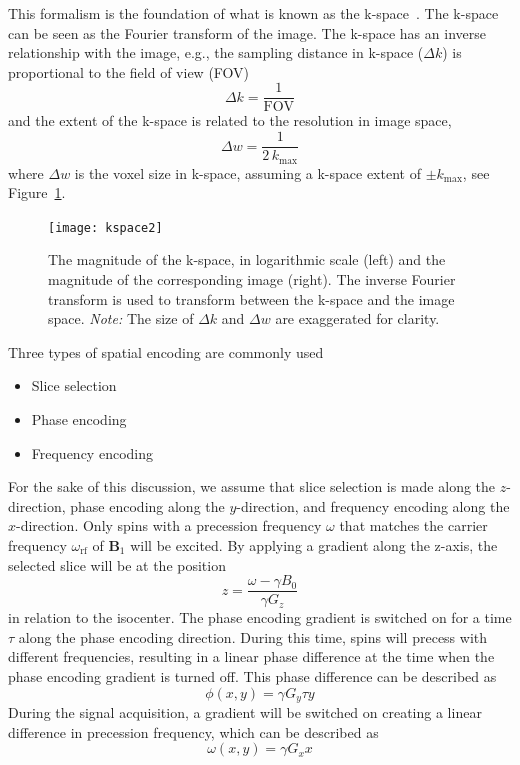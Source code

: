 This formalism is the foundation of what is known as the k-space~\cite{Twieg1983, Ljunggren1983}. The k-space can be seen as the Fourier transform of the image. The k-space has an inverse relationship with the image, e.g., the sampling distance in k-space ($\Delta k$) is proportional to the field of view (FOV) 
\begin{equation}
    \Delta k = \frac{1}{\textrm{FOV}}
\end{equation}
and the extent of the k-space is related to the resolution in image space,
\begin{equation}
    \Delta w = \frac{1}{2\, k_{\textrm{max}}}
\end{equation}
where $\Delta w$ is the voxel size in k-space, assuming a k-space extent of $\pm k_{\textrm{max}}$, see Figure~\ref{fig:kspace}.
\begin{figure}[htbp]
    \centering
    \texttt{[image: kspace2]}
    \caption{The magnitude of the k-space, in logarithmic scale (left) and the magnitude of the corresponding image (right). The inverse Fourier transform is used to transform between the k-space and the image space. \emph{Note:} The size of $\Delta k$ and $\Delta w$ are exaggerated for clarity.}
    \label{fig:kspace}
\end{figure}

Three types of spatial encoding are commonly used
\begin{itemize}
    \item Slice selection
    \item Phase encoding
    \item Frequency encoding
\end{itemize}

For the sake of this discussion, we assume that slice selection is made along the $z$-direction, phase encoding along the $y$-direction, and frequency encoding along the $x$-direction.
Only spins with a precession frequency $\omega$ that matches the carrier frequency $\omega_{\textrm{rf}}$  of $\textbf{B}_1$ will be excited. By applying a gradient along the z-axis, the selected slice will be at the position
\begin{equation}
    z = \frac{\omega - \gamma B_0}{\gamma G_z}
\end{equation}
in relation to the isocenter.
The phase encoding gradient is switched on for a time $\tau$ along the phase encoding direction. During this time, spins will precess with different frequencies, resulting in a linear phase difference at the time when the phase encoding gradient is turned off. This phase difference can be described as
\begin{equation}
    \phi(x,y) = \gamma G_y \tau y
\end{equation}
During the signal acquisition, a gradient will be switched on creating a linear difference in precession frequency, which can be described as
\begin{equation}
    \omega(x,y) = \gamma G_x x
\end{equation}

